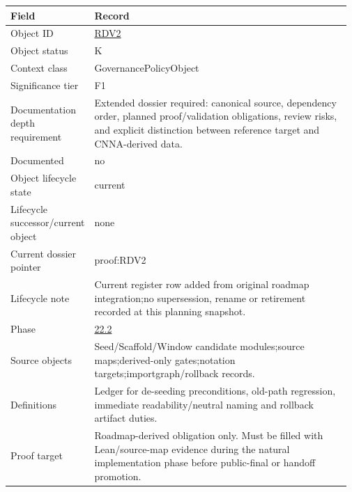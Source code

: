 \begin{longtable}{L{0.16\linewidth} L{0.81\linewidth}}
\hline
\textbf{Field} & \textbf{Record}\\
\hline
Object ID & \hyperlink{object-row-RDV2}{RDV2}\\
\hline\addlinespace[0.20em]
Object status & K\\
\hline\addlinespace[0.20em]
Context class & GovernancePolicyObject\\
\hline\addlinespace[0.20em]
Significance tier & F1\\
\hline\addlinespace[0.20em]
Documentation depth requirement & Extended dossier required: canonical source, dependency order, planned proof/\allowbreak{}validation obligations, review risks, and explicit distinction between reference target and CNNA-derived data.\\
\hline\addlinespace[0.20em]
Documented & no\\
\hline\addlinespace[0.20em]
Object lifecycle state & current\\
\hline\addlinespace[0.20em]
Lifecycle successor/\allowbreak{}current object & none\\
\hline\addlinespace[0.20em]
Current dossier pointer & proof:RDV2\\
\hline\addlinespace[0.20em]
Lifecycle note & Current register row added from original roadmap integration;\newline no supersession, rename or retirement recorded at this planning snapshot.\\
\hline\addlinespace[0.20em]
Phase & \hyperlink{phase-row-22-2}{22.2}\\
\hline\addlinespace[0.20em]
Source objects & Seed/\allowbreak{}Scaffold/\allowbreak{}Window candidate modules;\newline source maps;\newline derived-only gates;\newline notation targets;\newline importgraph/\allowbreak{}rollback records.\\
\hline\addlinespace[0.20em]
Definitions & Ledger for de-seeding preconditions, old-path regression, immediate readability/\allowbreak{}neutral naming and rollback artifact duties.\\
\hline\addlinespace[0.20em]
Proof target & Roadmap-derived obligation only. Must be filled with Lean/\allowbreak{}source-map evidence during the natural implementation phase before public-final or handoff promotion.\\

\end{longtable}
